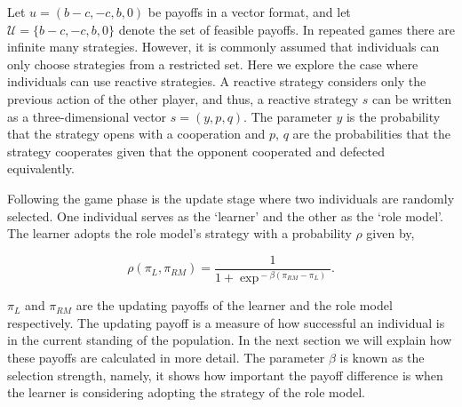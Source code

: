\documentclass[11pt]{article}
\theoremstyle{plainCl1}
\theoremstyle{plainCl2}
\begin{document}
Let \(u = (b-c, -c, b, 0)\) be payoffs in a vector format, and let \(\mathcal{U}
= \{b-c, -c, b, 0\}\) denote the set of feasible payoffs. In repeated games
there are infinite many strategies. However, it is commonly assumed that
individuals can only choose strategies from a restricted set. Here we explore
the case where individuals can use reactive strategies. A reactive strategy
considers only the previous action of the other player, and thus, a reactive
strategy \(s\) can be written as a three-dimensional vector \(s=(y, p, q)\). The
parameter \(y\) is the probability that the strategy opens with a cooperation
and \(p\), \(q\) are the probabilities that the strategy cooperates given that
the opponent cooperated and defected equivalently.

Following the game phase is the update stage where two individuals are randomly selected.
One individual serves as the `learner' and the other as the `role model'.
The learner adopts the role model's strategy with a probability \(\rho\) given by,

\begin{equation} \label{Eq:rho}
    \rho(\pi_{L}, \pi_{RM}) = \frac{1}{1\!+\! \exp^{\!-\!\beta (\pi_{RM}\!-\! \pi_{L})}}.
\end{equation}

\(\pi_{L}\) and \(\pi_{RM}\) are the updating payoffs of the learner and the
role model respectively. The updating payoff is a measure of how successful an
individual is in the current standing of the population. In the next section we
will explain how these payoffs are calculated in more detail. The parameter
\(\beta\) is known as the selection strength, namely, it shows how important the
payoff difference is when the learner is considering adopting the strategy of
the role model.
\end{document}
